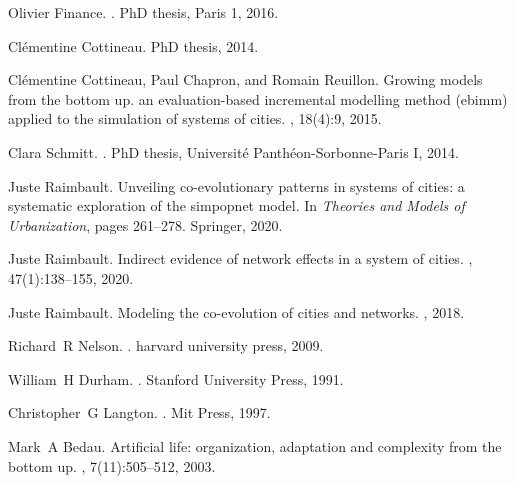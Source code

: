 \documentclass[11pt]{article}
\begin{document}
\begin{thebibliography}{10}
Olivier Finance.
.
\newblock PhD thesis, Paris 1, 2016.

Cl{\'e}mentine Cottineau.
\newblock PhD thesis, 2014.

Cl{\'e}mentine Cottineau, Paul Chapron, and Romain Reuillon.
\newblock Growing models from the bottom up. an evaluation-based incremental
  modelling method (ebimm) applied to the simulation of systems of cities.
, 18(4):9,
  2015.

Clara Schmitt.
.
\newblock PhD thesis, Universit{\'e} Panth{\'e}on-Sorbonne-Paris I, 2014.

Juste Raimbault.
\newblock Unveiling co-evolutionary patterns in systems of cities: a systematic
  exploration of the simpopnet model.
\newblock In {\em Theories and Models of Urbanization}, pages 261--278.
  Springer, 2020.

Juste Raimbault.
\newblock Indirect evidence of network effects in a system of cities.
,
  47(1):138--155, 2020.

Juste Raimbault.
\newblock Modeling the co-evolution of cities and networks.
, 2018.

Richard~R Nelson.
.
\newblock harvard university press, 2009.

William~H Durham.
.
\newblock Stanford University Press, 1991.

Christopher~G Langton.
.
\newblock Mit Press, 1997.

Mark~A Bedau.
\newblock Artificial life: organization, adaptation and complexity from the
  bottom up.
, 7(11):505--512, 2003.


\end{thebibliography}
\end{document}
